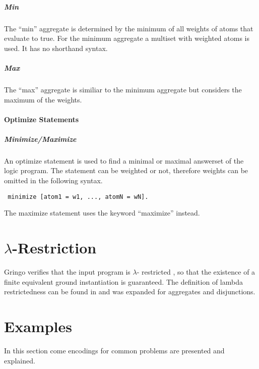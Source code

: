 \documentclass[a4paper,10pt]{article}
\begin{document}
\subparagraph{Min}
The ``min'' aggregate is determined by the minimum of all weights of atoms that evaluate to true.
For the minimum aggregate a multiset with weighted atoms is used. It has no shorthand syntax.
\subparagraph{Max}
The ``max'' aggregate is similiar to the minimum aggregate but considers the maximum of the weights.

\paragraph{Optimize Statements}

\subparagraph{Minimize/Maximize}
An optimize statement is used to find a minimal or maximal answerset of the logic program.
The statement can be weighted or not, therefore weights can be omitted in the following syntax.
\begin{verbatim}
 minimize [atom1 = w1, ..., atomN = wN].
\end{verbatim}
The maximize statement uses the keyword ``maximize'' instead.

\section{$\lambda$-Restriction}
\label{domainrestricted}
Gringo verifies that the input program is $\lambda$-
restricted \cite{gringopaper}, so that the existence of a finite equivalent ground instantiation is guaranteed. The definition of lambda restrictedness can be found in \cite{gringopaper} and was expanded for aggregates and disjunctions.


\section{Examples}
In this section come encodings for common problems are presented and explained.
\end{document}
